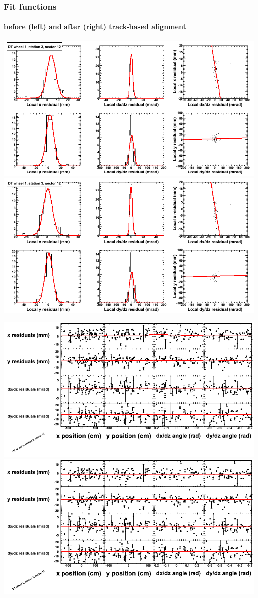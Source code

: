 \documentclass[compress]{beamer}
\begin{document}
\begin{frame}
\frametitle{Fit functions}
\framesubtitle{before (left) and after (right) track-based alignment}
\includegraphics[width=0.5\linewidth]{fitfunctions_re01/MBwhDst3sec12_bellcurves.png} \includegraphics[width=0.5\linewidth]{fitfunctions_re05/MBwhDst3sec12_bellcurves.png}

\includegraphics[width=0.5\linewidth]{fitfunctions_re01/MBwhDst3sec12_polynomials.png} \includegraphics[width=0.5\linewidth]{fitfunctions_re05/MBwhDst3sec12_polynomials.png}
\end{frame}
\end{document}
